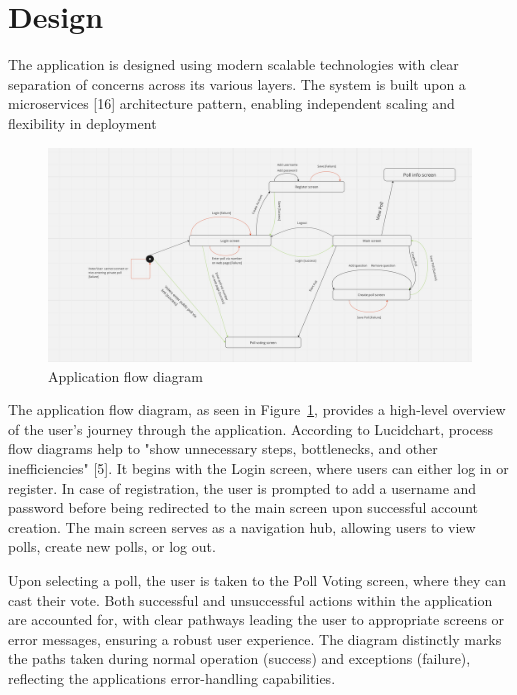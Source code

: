 \section{Design}
\label{sec:design}

The application is designed using modern scalable technologies with clear separation of concerns across its various layers. 
The system is built upon a microservices [16] architecture pattern, enabling independent scaling and flexibility in deployment


\begin{figure}[!htbp]
\centering
\includegraphics[width=\linewidth]{figs/ApplicationFlowDiagram.png}
\caption{Application flow diagram}
\label{fig:appflow}
\end{figure}

The application flow diagram, as seen in Figure~\ref{fig:appflow}, provides a high-level overview of the user's journey through the application. According to Lucidchart, process flow diagrams help to "show unnecessary steps, bottlenecks, and other inefficiencies" [5]. It begins with the Login screen, where users can either log in or register. In case of registration, the user is prompted to add a username and password before being redirected to the main screen upon successful account creation. The main screen serves as a navigation hub, allowing users to view polls, create new polls, or log out.

Upon selecting a poll, the user is taken to the Poll Voting screen, where they can cast their vote. Both successful and unsuccessful actions within the application are accounted for, with clear pathways leading the user to appropriate screens or error messages, ensuring a robust user experience. The diagram distinctly marks the paths taken during normal operation (success) and exceptions (failure), reflecting the applications error-handling capabilities.

